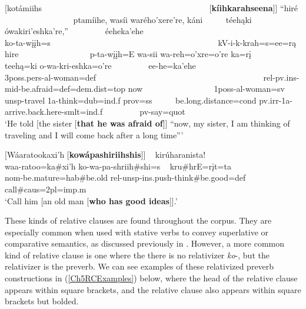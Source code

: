 \begin{exe}
\begin{xlist}
        \item\label{Ch5HeadedRCsE} \glll \textnormal{[}kotámiihs ~ ~ ~ ~ ~ ~ ~ ~ ~ ~ ~ ~ ~ ~ ~ ~ ~ ~ ~ ~ ~ ~ ~ ~  \textnormal{[}\textbf{kíihkarahseena}\textnormal{]]} ``hiré ~ ~ ~ ~ ~ ~ ~ ~ ~ ~ ptamíihe, wasíi warého'xere're, káni ~ ~ ~ téehąki ówakiri'eshka're,'' ~ ~ ~ ~ ~ éeheka'ehe\\
	ko-ta-wįįh=s ~ ~ ~ ~ ~ ~ ~ ~ ~ ~ ~ ~ ~ ~ ~ ~ ~ ~ ~ ~ ~ ~ ~ ~ kV-i-k-krah=s=ee=rą hire ~ ~ ~ ~ ~ ~ ~ ~ ~ ~ p-ta-wįįh=E wa-sii wa-reh=o'xre=o're ka=rį ~ ~ ~ teehą=ki o-wa-kri-eshka=o're ~ ~ ~ ~ ~ ee-he=ka'ehe\\
	3poss.pers-al-\textnormal{woman}=def ~ ~ ~ ~ ~ ~ ~ ~ ~ ~ ~ ~ ~ ~ ~ ~ ~ ~ ~ ~ ~ ~ ~ ~ rel-pv.ins-mid-\textnormal{be.afraid}=def=dem.dist=top \textnormal{now} ~ ~ ~ ~ ~ ~ ~ ~ ~ ~ 1poss-al-\textnormal{woman}=sv unsp-\textnormal{travel} 1a-\textnormal{think}=dub=ind.f prov=ss ~ ~ ~ \textnormal{be.long.distance}=cond pv.irr-1a-\textnormal{arrive.back.here}-smlt=ind.f ~ ~ ~ ~ ~ pv-\textnormal{say}=quot\\
	\glt 	`He told [the sister [\textbf{that he was afraid of}]] ``now, my sister, I am thinking of traveling and I will come back after a long time''' \citep[281]{hollow1973b}

    \item\label{Ch5HeadedRCsF} \glll \textnormal{[}Wáaratookaxi'h \textnormal{[}\textbf{kowápashiriihshis}\textnormal{]]} ~ kirúharanista!\\
    waa-ratoo=ka\#xi'h ko-wa-pa-shriih\#shi=s ~ kru\#hrE=rįt=ta\\
    nom-\textnormal{be.mature}=hab\#\textnormal{be.old} rel-unsp-ins.push-\textnormal{think}\#\textnormal{be.good}=def ~ \textnormal{call}\#caus=2pl=imp.m\\
    \glt `Call him [an old man [\textbf{who has good ideas}]].' \citep[167]{hollow1973b}
    \end{xlist}
    
\end{exe}

These kinds of relative clauses are found throughout the corpus. They are especially common when used with stative verbs to convey superlative or comparative semantics, as discussed previously in . However, a more common kind of relative clause is one where the there is no relativizer \textit{ko}-, but the relativizer is the preverb. We can see examples of these relativized preverb constructions in (\ref{Ch5RCExamples}) below, where the head of the relative clause appears within square brackets, and the relative clause also appears within square brackets but bolded.

